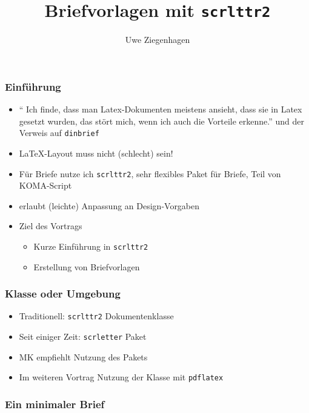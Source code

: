 \documentclass[12pt,ngerman]{beamer}
\author{Uwe Ziegenhagen}
\title{Briefvorlagen mit \texttt{scrlttr2}}
\begin{document}
\begin{frame}

\maketitle

\end{frame}

\begin{frame}
\frametitle{Einführung}

\begin{itemize}
\item \enquote{ Ich finde, dass man Latex-Dokumenten meistens ansieht, dass sie in Latex gesetzt wurden, das stört mich, wenn ich auch die Vorteile erkenne.} und der Verweis auf \texttt{dinbrief}
\item \LaTeX-Layout muss nicht (schlecht) sein!
\item Für Briefe nutze ich \texttt{scrlttr2}, sehr flexibles Paket für Briefe, Teil von KOMA-Script
\item erlaubt (leichte) Anpassung an Design-Vorgaben
\item Ziel des Vortrags

\begin{itemize}
	\item Kurze Einführung in \texttt{scrlttr2}
	\item Erstellung von Briefvorlagen
\end{itemize}


\end{itemize}
\end{frame}

\begin{frame}
\frametitle{Klasse oder Umgebung}

\begin{itemize}
\item Traditionell: \texttt{scrlttr2} Dokumentenklasse
\item Seit einiger Zeit: \texttt{scrletter} Paket
\item MK empfiehlt Nutzung des Pakets
\item Im weiteren Vortrag Nutzung der Klasse mit \texttt{pdflatex}
\end{itemize}
\end{frame}


\begin{frame}[fragile]
\frametitle{Ein minimaler Brief}



\end{frame}
\end{document}
